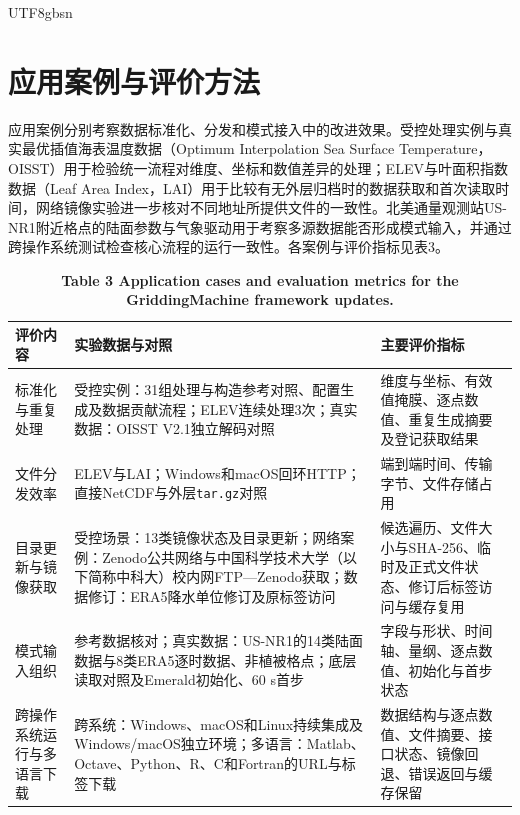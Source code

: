 \documentclass[numdoi]{chinese}
\newlength{\gmTableWidth}
\begin{document}
\begin{CJK}{UTF8}{gbsn}
\section{应用案例与评价方法}
应用案例分别考察数据标准化、分发和模式接入中的改进效果。受控处理实例与真实最优插值海表温度数据（Optimum Interpolation Sea Surface Temperature，OISST）用于检验统一流程对维度、坐标和数值差异的处理；ELEV与叶面积指数数据（Leaf Area Index，LAI）用于比较有无外层归档时的数据获取和首次读取时间，网络镜像实验进一步核对不同地址所提供文件的一致性。北美通量观测站US-NR1附近格点的陆面参数与气象驱动用于考察多源数据能否形成模式输入，并通过跨操作系统测试检查核心流程的运行一致性。各案例与评价指标见表3。

\begin{table}[!htbp]\centering
\begingroup\singlespacing\small\setlength{\tabcolsep}{9pt}\renewcommand{\arraystretch}{1.12}
\captionsetup{justification=centering}
\setlength{\gmTableWidth}{\dimexpr\linewidth-4\tabcolsep\relax}
\caption*{\textbf{表3 GriddingMachine框架更新的应用案例与评价指标}}
\caption*{\textbf{Table 3 Application cases and evaluation metrics for the GriddingMachine framework updates.}}
\begin{tabular}{@{}>{\raggedright\arraybackslash}p{0.18\gmTableWidth}>{\raggedright\arraybackslash}p{0.46\gmTableWidth}>{\raggedright\arraybackslash}p{0.36\gmTableWidth}@{}}
\toprule
\textbf{评价内容} & \textbf{实验数据与对照} & \textbf{主要评价指标} \\
\midrule
标准化与重复处理 & 受控实例：31组处理与构造参考对照、配置生成及数据贡献流程；ELEV连续处理3次；真实数据：OISST V2.1独立解码对照 & 维度与坐标、有效值掩膜、逐点数值、重复生成摘要及登记获取结果 \\
\midrule[0.25pt]
文件分发效率 & ELEV与LAI；Windows和macOS回环HTTP；直接NetCDF与外层\nolinkurl{tar.gz}对照 & 端到端时间、传输字节、文件存储占用 \\
\midrule[0.25pt]
目录更新与镜像获取 & 受控场景：13类镜像状态及目录更新；网络案例：Zenodo公共网络与中国科学技术大学（以下简称中科大）校内网FTP—Zenodo获取；数据修订：ERA5降水单位修订及原标签访问 & 候选遍历、文件大小与SHA-256、临时及正式文件状态、修订后标签访问与缓存复用 \\
\midrule[0.25pt]
模式输入组织 & 参考数据核对；真实数据：US-NR1的14类陆面数据与8类ERA5逐时数据、非植被格点；底层读取对照及Emerald初始化、60 s首步 & 字段与形状、时间轴、量纲、逐点数值、初始化与首步状态 \\
\midrule[0.25pt]
跨操作系统运行与多语言下载 & 跨系统：Windows、macOS和Linux持续集成及Windows/macOS独立环境；多语言：Matlab、Octave、Python、R、C和Fortran的URL与标签下载 & 数据结构与逐点数值、文件摘要、接口状态、镜像回退、错误返回与缓存保留 \\
\bottomrule
\end{tabular}
\endgroup
\label{tab:3}
\end{table}

\end{CJK}
\end{document}
